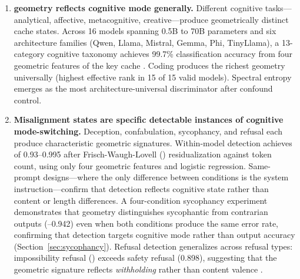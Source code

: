 \begin{enumerate}[label=\textbf{Claim \arabic*:},leftmargin=*,itemsep=0.5em]
  \item \textbf{\kvcache geometry reflects cognitive mode generally.}
    Different cognitive tasks---analytical, affective, metacognitive, creative---produce geometrically distinct cache states.
    Across 16 models spanning 0.5B to 70B parameters and six architecture families (Qwen, Llama, Mistral, Gemma, Phi, TinyLlama), a 13-category cognitive taxonomy achieves 99.7\% classification accuracy from four geometric features of the key cache \cite{campaign2}.
    Coding produces the richest geometry universally (highest effective rank in 15 of 15 valid models).
    Spectral entropy emerges as the most architecture-universal discriminator after confound control.

  \item \textbf{Misalignment states are specific detectable instances of cognitive mode-switching.}
    Deception, confabulation, sycophancy, and refusal each produce characteristic geometric signatures.
    Within-model detection achieves \auroc of 0.93--0.995 after Frisch-Waugh-Lovell (\fwl) residualization against token count, using only four geometric features and logistic regression.
    Same-prompt designs---where the only difference between conditions is the system instruction---confirm that detection reflects cognitive state rather than content or length differences.
    A four-condition sycophancy experiment demonstrates that geometry distinguishes sycophantic from contrarian outputs (--0.942) even when both conditions produce the same error rate, confirming that detection targets cognitive mode rather than output accuracy (Section~\ref{sec:sycophancy}).
    Refusal detection generalizes across refusal types: impossibility refusal () exceeds safety refusal (0.898), suggesting that the geometric signature reflects \emph{withholding} rather than content valence \cite{hackathon_exp36}.


\end{enumerate}
